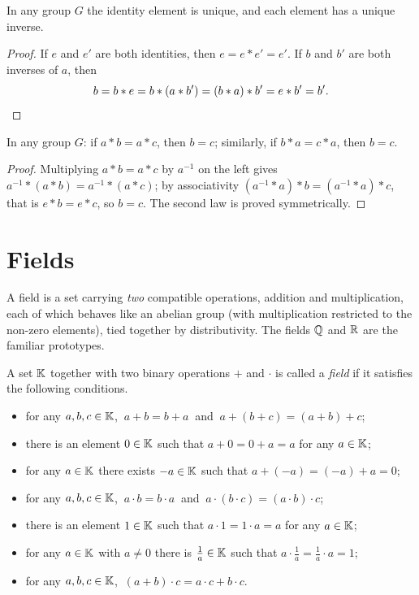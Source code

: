 \begin{fact}
In any group $G$ the identity element is unique, and each element has a unique inverse.
\end{fact}

\begin{proof}
If $e$ and $e'$ are both identities, then $e=e*e'=e'$. If $b$ and $b'$ are both inverses of $a$, then
\[
b = b*e = b*(a*b') = (b*a)*b' = e*b' = b'. \qedhere
\]
\end{proof}

\begin{fact}
In any group $G$: if $a*b = a*c$, then $b=c$; similarly, if $b*a = c*a$, then $b=c$.
\end{fact}

\begin{proof}
Multiplying $a*b=a*c$ by $a^{-1}$ on the left gives $a^{-1}*(a*b) = a^{-1}*(a*c)$; by associativity
$(a^{-1}*a)*b = (a^{-1}*a)*c$, that is $e*b = e*c$, so $b=c$. The second law is proved symmetrically.
\end{proof}

\section{Fields}

A field is a set carrying \emph{two} compatible operations, addition and multiplication, each of which behaves
like an abelian group (with multiplication restricted to the non-zero elements), tied together by
distributivity. The fields $\mathbb{Q}$ and $\mathbb{R}$ are the familiar prototypes.

\begin{definition}
A set $\mathbb{K}$ together with two binary operations $+$ and $\cdot$ is called a \emph{field} if it satisfies the
following conditions.
\begin{itemize}
\item for any $a,b,c\in \mathbb{K}$, $\ a+b=b+a\ $ and $\ a+(b+c)=(a+b)+c$;
\item there is an element $0\in \mathbb{K}$ such that $a+0=0+a=a$ for any $a\in \mathbb{K}$;
\item for any $a\in \mathbb{K}$ there exists $-a\in \mathbb{K}$ such that $a+(-a)=(-a)+a=0$;
\item for any $a,b,c\in \mathbb{K}$, $\ a\cdot b = b\cdot a\ $ and $\ a\cdot(b\cdot c)=(a\cdot b)\cdot c$;
\item there is an element $1\in \mathbb{K}$ such that $a\cdot 1=1\cdot a=a$ for any $a\in \mathbb{K}$;
\item for any $a\in \mathbb{K}$ with $a\neq 0$ there is $\tfrac{1}{a}\in \mathbb{K}$ such that
$a \cdot \tfrac{1}{a} = \tfrac{1}{a}\cdot a = 1$;
\item for any $a,b,c\in \mathbb{K}$, $\ (a+b)\cdot c = a\cdot c + b\cdot c$.
\end{itemize}
\end{definition}

